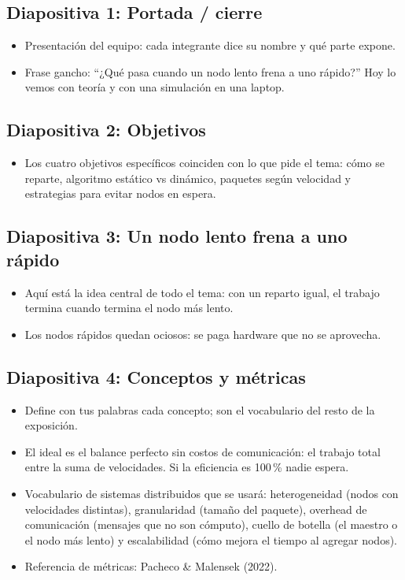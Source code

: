 \documentclass[11pt,a4paper]{article}
\begin{document}
\subsection*{Diapositiva 1: Portada / cierre}
\begin{itemize}
  \item Presentación del equipo: cada integrante dice su nombre y qué parte expone.
  \item Frase gancho: ``¿Qué pasa cuando un nodo lento frena a uno rápido?'' Hoy lo vemos con teoría y con una simulación en una laptop.
\end{itemize}

\subsection*{Diapositiva 2: Objetivos}
\begin{itemize}
  \item Los cuatro objetivos específicos coinciden con lo que pide el tema: cómo se reparte, algoritmo estático vs dinámico, paquetes según velocidad y estrategias para evitar nodos en espera.
\end{itemize}

\subsection*{Diapositiva 3: Un nodo lento frena a uno rápido}
\begin{itemize}
  \item Aquí está la idea central de todo el tema: con un reparto igual, el trabajo termina cuando termina el nodo más lento.
  \item Los nodos rápidos quedan ociosos: se paga hardware que no se aprovecha.
\end{itemize}

\subsection*{Diapositiva 4: Conceptos y métricas}
\begin{itemize}
  \item Define con tus palabras cada concepto; son el vocabulario del resto de la exposición.
  \item El ideal es el balance perfecto sin costos de comunicación: el trabajo total entre la suma de velocidades. Si la eficiencia es 100\,\% nadie espera.
  \item Vocabulario de sistemas distribuidos que se usará: heterogeneidad (nodos con velocidades distintas), granularidad (tamaño del paquete), overhead de comunicación (mensajes que no son cómputo), cuello de botella (el maestro o el nodo más lento) y escalabilidad (cómo mejora el tiempo al agregar nodos).
  \item Referencia de métricas: Pacheco \& Malensek (2022).
\end{itemize}
\end{document}
